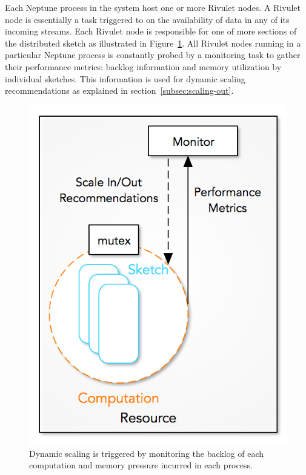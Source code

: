 Each Neptune process in the system host one or more Rivulet nodes.
A Rivulet node is essentially a task triggered to on the availability of data in any of its incoming streams.
Each Rivulet node is responsible for one of more sections of the distributed sketch as illustrated in Figure~\ref{fig:process-monitor}.
All Rivulet nodes running in a particular Neptune process is constantly probed by a monitoring task to gather their performance metrics: backlog information and memory utilization by individual sketches.
This information is used for dynamic scaling recommendations as explained in section~\ref{subsec:scaling-out}.

\begin{figure}
    \centerline{\includegraphics[scale=0.55]{figures/process-monitor.png}}
    \caption{Dynamic scaling is triggered by monitoring the backlog of each computation and memory pressure incurred in each process.}
    \label{fig:process-monitor}
\end{figure}